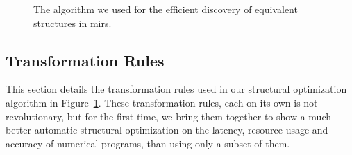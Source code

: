\begin{figure}[ht]
    \centering
    \begin{algorithmic}
            \EndFor
        \EndFor
    \EndWhile
\EndFunction
    \end{algorithmic}
    \caption{%
        The algorithm we used for the efficient discovery of equivalent
        structures in \glspl{mir}.
    }
    \label{lo:alg:optimize}
\end{figure}

\subsection{Transformation Rules}
\label{lo:sub:transformation_rules}

This section details the transformation rules used in our structural
optimization algorithm in Figure~\ref{lo:alg:optimize}.  These transformation
rules, each on its own is not revolutionary, but for the first time, we bring
them together to show a much better automatic structural optimization on the
latency, resource usage and accuracy of numerical programs, than using only a
subset of them.

